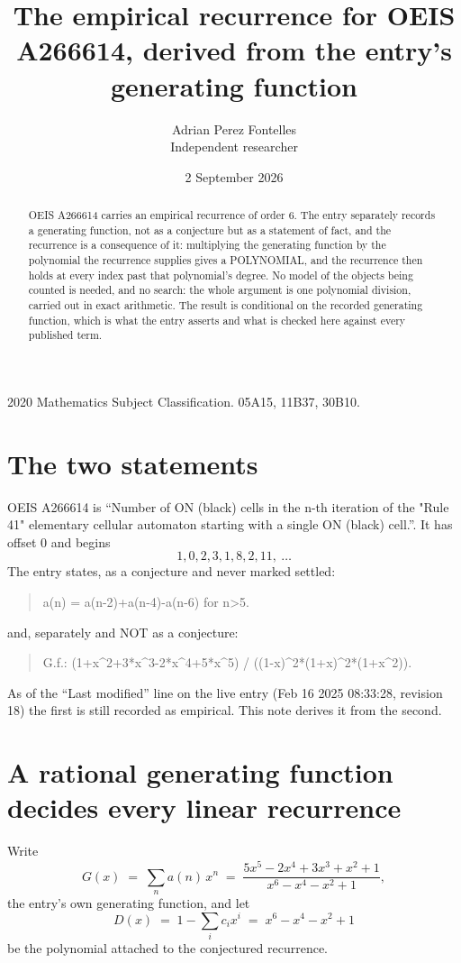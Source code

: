\documentclass[11pt,a4paper]{article}
\title{The empirical recurrence for OEIS A266614, derived from the entry's generating function}
\author{Adrian Perez Fontelles\\ \small Independent researcher}
\date{2 September 2026}
\theoremstyle{plain}
\theoremstyle{definition}
\begin{document}
\maketitle

\begin{abstract}
OEIS A266614 carries an empirical recurrence of order $6$. The entry separately records a
generating function, not as a conjecture but as a statement of fact, and the recurrence is a
consequence of it: multiplying the generating function by the polynomial the recurrence
supplies gives a POLYNOMIAL, and the recurrence then holds at every index past that
polynomial's degree. No model of the objects being counted is needed, and no search: the
whole argument is one polynomial division, carried out in exact arithmetic. The result is
conditional on the recorded generating function, which is what the entry asserts and what is
checked here against every published term.
\end{abstract}

\noindent\small 2020 Mathematics Subject Classification. 05A15, 11B37, 30B10.\normalsize

\section{The two statements}

OEIS A266614 is ``Number of ON (black) cells in the n-th iteration of the "Rule 41" elementary cellular automaton starting with a single ON (black) cell.''. It has offset $0$ and begins
\[
1, 0, 2, 3, 1, 8, 2, 11,\ \dots
\]
The entry states, as a conjecture and never marked settled:
\begin{quote}
a(n) = a(n-2)+a(n-4)-a(n-6) for n>5.
\end{quote}
and, separately and NOT as a conjecture:
\begin{quote}
G.f.: (1+x\^{}2+3*x\^{}3-2*x\^{}4+5*x\^{}5) / ((1-x)\^{}2*(1+x)\^{}2*(1+x\^{}2)).
\end{quote}
As of the ``Last modified'' line on the live entry (Feb 16 2025 08:33:28, revision 18) the first is still
recorded as empirical. This note derives it from the second.

\section{A rational generating function decides every linear recurrence}

Write
\[
G(x)\;=\;\sum_{n}a(n)\,x^{n}\;=\;\frac{5 x^{5} - 2 x^{4} + 3 x^{3} + x^{2} + 1}{x^{6} - x^{4} - x^{2} + 1},
\]
the entry's own generating function, and let
\[
D(x)\;=\;1-\sum_i c_i x^{i}\;=\;x^{6} - x^{4} - x^{2} + 1
\]
be the polynomial attached to the conjectured recurrence.
\end{document}

